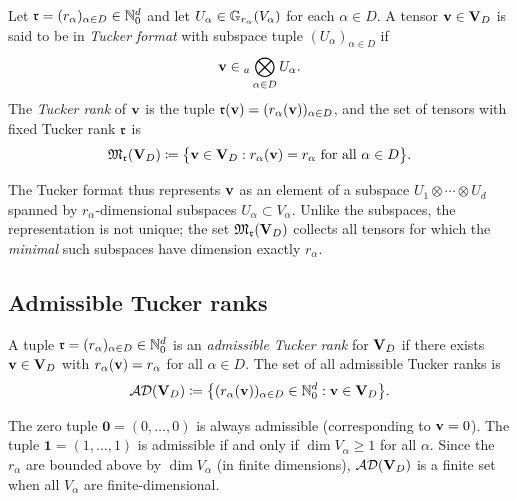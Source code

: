 \begin{definition}
\label{def:tucker_format}
Let $\mathfrak{r} = (r_\alpha)_{\alpha \in D} \in \mathbb{N}_0^d$ and let $U_\alpha \in
\mathbb{G}_{r_\alpha}(V_\alpha)$ for each $\alpha \in D$. A tensor
$\mathbf{v} \in \mathbf{V}_D$ is said to be in \emph{Tucker format} with subspace
tuple $(U_\alpha)_{\alpha \in D}$ if
\begin{equation*}
    \mathbf{v} \in {}_a\bigotimes_{\alpha \in D} U_\alpha.
\end{equation*}
The \emph{Tucker rank} of $\mathbf{v}$ is the tuple
$\mathfrak{r}(\mathbf{v}) = (r_\alpha(\mathbf{v}))_{\alpha \in D}$,
and the set of tensors with fixed Tucker rank $\mathfrak{r}$ is
\begin{equation}
\label{eq:Tucker_set}
    \mathfrak{M}_{\mathfrak{r}}(\mathbf{V}_D) \coloneqq
    \bigl\{
        \mathbf{v} \in \mathbf{V}_D : r_\alpha(\mathbf{v}) = r_\alpha \text{ for all } \alpha \in D
    \bigr\}.
\end{equation}
\end{definition}

The Tucker format thus represents $\mathbf{v}$ as an element of a subspace
$U_1 \otimes \cdots \otimes U_d$ spanned by $r_\alpha$-dimensional
subspaces $U_\alpha \subset V_\alpha$. Unlike the subspaces, the
representation is not unique; the set $\mathfrak{M}_{\mathfrak{r}}(\mathbf{V}_D)$ collects all
tensors for which the \emph{minimal} such subspaces have dimension
exactly $r_\alpha$.

\subsection*{Admissible Tucker ranks}

\begin{definition}
\label{def:admissible_tucker}
A tuple $\mathfrak{r} = (r_\alpha)_{\alpha \in D} \in \mathbb{N}_0^d$ is an
\emph{admissible Tucker rank} for $\mathbf{V}_D$ if there exists $\mathbf{v} \in \mathbf{V}_D$
with $r_\alpha(\mathbf{v}) = r_\alpha$ for all $\alpha \in D$. The set of all
admissible Tucker ranks is
\begin{equation}
\label{eq:AD_tucker}
    \mathcal{AD}(\mathbf{V}_D) \coloneqq
    \bigl\{
        (r_\alpha(\mathbf{v}))_{\alpha \in D} \in \mathbb{N}_0^d : \mathbf{v} \in \mathbf{V}_D
    \bigr\}.
\end{equation}
\end{definition}

The zero tuple $\mathbf{0} = (0,\ldots,0)$ is always admissible
(corresponding to $\mathbf{v} = 0$). The tuple $\mathbf{1} = (1,\ldots,1)$
is admissible if and only if $\dim V_\alpha \geq 1$ for all $\alpha$.
Since the $r_\alpha$ are bounded above by $\dim V_\alpha$ (in finite
dimensions), $\mathcal{AD}(\mathbf{V}_D)$ is a finite set when all $V_\alpha$ are
finite-dimensional.

